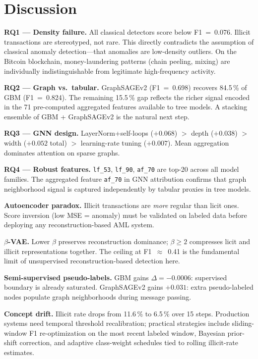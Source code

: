 \documentclass[conference]{IEEEtran}
\begin{document}
\section{Discussion}
\label{sec:discussion}

\textbf{RQ1 --- Density failure.}
All classical detectors score below F1~=~0.076.  Illicit transactions are
stereotyped, not rare.  This directly contradicts the assumption of classical
anomaly detection---that anomalies are low-density outliers.  On the Bitcoin
blockchain, money-laundering patterns (chain peeling, mixing) are individually
indistinguishable from legitimate high-frequency activity.

\textbf{RQ2 --- Graph vs.\ tabular.}
GraphSAGEv2 (F1~=~0.698) recovers 84.5\,\% of GBM (F1~=~0.824).  The
remaining 15.5\,\% gap reflects the richer signal encoded in the 71
pre-computed aggregated features available to tree models.  A stacking
ensemble of GBM + GraphSAGEv2 is the natural next step.

\textbf{RQ3 --- GNN design.}
LayerNorm+self-loops ($+0.068$) $>$ depth ($+0.038$) $>$ width ($+0.052$
total) $>$ learning-rate tuning ($+0.007$).  Mean aggregation dominates
attention on sparse graphs.

\textbf{RQ4 --- Robust features.}
\texttt{lf\_53}, \texttt{lf\_90}, \texttt{af\_70} are top-20 across all
model families.  The aggregated feature \texttt{af\_70} in GNN attribution
confirms that graph neighborhood signal is captured independently by tabular
proxies in tree models.

\textbf{Autoencoder paradox.}
Illicit transactions are \emph{more} regular than licit ones.  Score
inversion (low MSE = anomaly) must be validated on labeled data before
deploying any reconstruction-based AML system.

\textbf{$\beta$-VAE.}
Lower $\beta$ preserves reconstruction dominance; $\beta{\ge}2$ compresses
licit and illicit representations together.  The ceiling at F1~$\approx$~0.41
is the fundamental limit of unsupervised reconstruction-based detection here.

\textbf{Semi-supervised pseudo-labels.}
GBM gains $\Delta{=}-0.0006$: supervised boundary is already saturated.
GraphSAGEv2 gains $+0.031$: extra pseudo-labeled nodes populate graph
neighborhoods during message passing.

\textbf{Concept drift.}
Illicit rate drops from 11.6\,\% to 6.5\,\% over 15 steps.  Production
systems need temporal threshold recalibration; practical strategies include
sliding-window F1 re-optimization on the most recent labeled window,
Bayesian prior-shift correction, and adaptive class-weight schedules tied
to rolling illicit-rate estimates.
\end{document}
